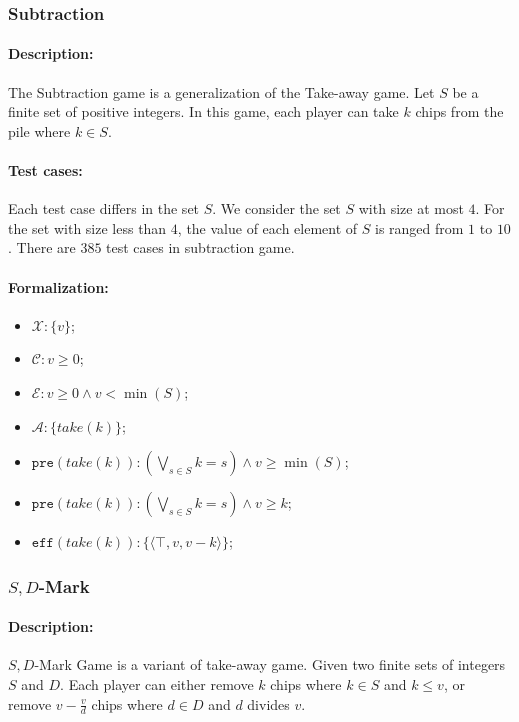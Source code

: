 \documentclass[review]{elsarticle}
\newcommand{\set}[1]{\{ #1 \}}
\newcommand{\tuple}[1]{\langle {#1} \rangle}
\newcommand{\true}{\top}
\newcommand{\statevar}{\mathcal{X}}
\newcommand{\act}{\mathcal{A}}
\newcommand{\constraint}{\mathcal{C}}
\newcommand{\estate}{\mathcal{E}}
\newcommand{\pre}{\mathtt{pre}}
\newcommand{\eff}{\mathtt{eff}}
\begin{document}
\subsubsection{Subtraction \protect\cite{Yag2001}}

\paragraph{Description:} 
The Subtraction game is a generalization of the Take-away game.
Let $S$ be a finite set of positive integers.
In this game, each player can take $k$ chips from the pile where $ k \in S$.

\paragraph{Test cases:}
Each test case differs in the set $S$. %
We consider the set $S$ with size at most $4$.
For the set with size less than $4$, the value of each element of $S$ is ranged from $1$ to $10$.
There are $385$ test cases in subtraction game.

\paragraph{Formalization:}

\begin{itemize}
	\item $\statevar: \set{v}$;
	\item $\constraint: v \ge 0 $;
		\item $\estate:  v \ge 0 \wedge v < \min(S) $;
		\item $\act: \set{take(k)}$;
		\item $\pre(take(k)) : (\bigvee_{s \in S} k = s) \land v \geq \min(S) $;
		\item {\color{red}$\pre(take(k)) : (\bigvee_{s \in S} k = s) \land v \geq k$;}
		\item $\eff(take(k)) : \set{\tuple{\true, v, v-k}}$;
\end{itemize}

\subsubsection{$S,D$-Mark \protect\cite{Sop2016}}

\paragraph{Description:}
$S, D$-Mark Game is a variant of take-away game.
Given two finite sets of integers $S$ and $D$. 
Each player can either remove $k$ chips where $k \in S$ and $k \le v$, or remove $v - \frac{v}{d}$ chips where $d \in D $ and $d$ divides $v$. 
\end{document}
